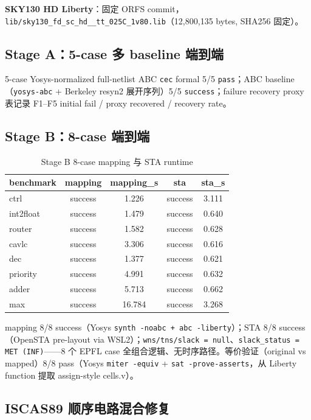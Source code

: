 \documentclass[journal]{IEEEtran}
\begin{document}
\textbf{SKY130 HD Liberty}：固定 ORFS commit，\texttt{lib/sky130\_fd\_sc\_hd\_\_tt\_025C\_1v80.lib}（12,800,135 bytes, SHA256 固定）。

\subsection{Stage A：5-case 多 baseline 端到端}

5-case Yosys-normalized full-netlist ABC \texttt{cec} formal 5/5 \texttt{pass}；ABC baseline（\texttt{yosys-abc} + Berkeley resyn2 展开序列）5/5 \texttt{success}；failure recovery proxy 表记录 F1--F5 initial fail / proxy recovered / recovery rate。

\subsection{Stage B：8-case 端到端}

\begin{table}[!t]
\centering
\caption{Stage B 8-case mapping 与 STA runtime}
\label{tab:stageb}
\scriptsize
\setlength{\tabcolsep}{4pt}
\begin{tabular}{lcccc}
\toprule
\textbf{benchmark} & \textbf{mapping} & \textbf{mapping\_s} & \textbf{sta} & \textbf{sta\_s} \\
\midrule
ctrl & success & 1.226 & success & 3.111 \\
int2float & success & 1.479 & success & 0.640 \\
router & success & 1.582 & success & 0.628 \\
cavlc & success & 3.306 & success & 0.616 \\
dec & success & 1.377 & success & 0.621 \\
priority & success & 4.991 & success & 0.632 \\
adder & success & 5.713 & success & 0.662 \\
max & success & 16.784 & success & 3.268 \\
\bottomrule
\end{tabular}
\end{table}

mapping 8/8 success（Yosys \texttt{synth -noabc + abc -liberty}）；STA 8/8 success（OpenSTA pre-layout via WSL2）；\texttt{wns/tns/slack = null}、\texttt{slack\_status = MET (INF)}——8 个 EPFL case 全组合逻辑、无时序路径。等价验证（original vs mapped）8/8 pass（Yosys \texttt{miter -equiv} + \texttt{sat -prove-asserts}，从 Liberty function 提取 assign-style cells.v）。

\subsection{ISCAS89 顺序电路混合修复}\label{sec:iscas}
\end{document}
